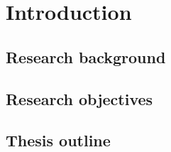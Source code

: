 \chapter{Introduction}

\section{Research background}

\section{Research objectives}

\section{Thesis outline}
